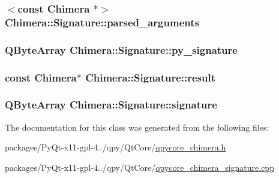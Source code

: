 \subsubsection[{parsed\+\_\+arguments}]{$<$const {\bf Chimera} $\ast$$>$ Chimera\+::\+Signature\+::parsed\+\_\+arguments}\label{classChimera_1_1Signature_a1f27eded188ed6a59cca157965a5f461}
\hypertarget{classChimera_1_1Signature_aae881828f30d7530591ec36f6a4cd839}{}
\subsubsection[{py\+\_\+signature}]{\setlength{\rightskip}{0pt plus 5cm}Q\+Byte\+Array Chimera\+::\+Signature\+::py\+\_\+signature}\label{classChimera_1_1Signature_aae881828f30d7530591ec36f6a4cd839}
\hypertarget{classChimera_1_1Signature_a609dfc0977009c62c2da57a84c7a0136}{}
\subsubsection[{result}]{\setlength{\rightskip}{0pt plus 5cm}const {\bf Chimera}$\ast$ Chimera\+::\+Signature\+::result}\label{classChimera_1_1Signature_a609dfc0977009c62c2da57a84c7a0136}
\hypertarget{classChimera_1_1Signature_a66bb1195f11c396b09e44ad5bed54ba1}{}
\subsubsection[{signature}]{\setlength{\rightskip}{0pt plus 5cm}Q\+Byte\+Array Chimera\+::\+Signature\+::signature}\label{classChimera_1_1Signature_a66bb1195f11c396b09e44ad5bed54ba1}


The documentation for this class was generated from the following files\+:\begin{DoxyCompactItemize}
\item 
packages/\+Py\+Qt-\/x11-\/gpl-\/4../qpy/\+Qt\+Core/\hyperlink{qpycore__chimera_8h}{qpycore\+\_\+chimera.\+h}\item 
packages/\+Py\+Qt-\/x11-\/gpl-\/4../qpy/\+Qt\+Core/\hyperlink{qpycore__chimera__signature_8cpp}{qpycore\+\_\+chimera\+\_\+signature.\+cpp}\end{DoxyCompactItemize}
